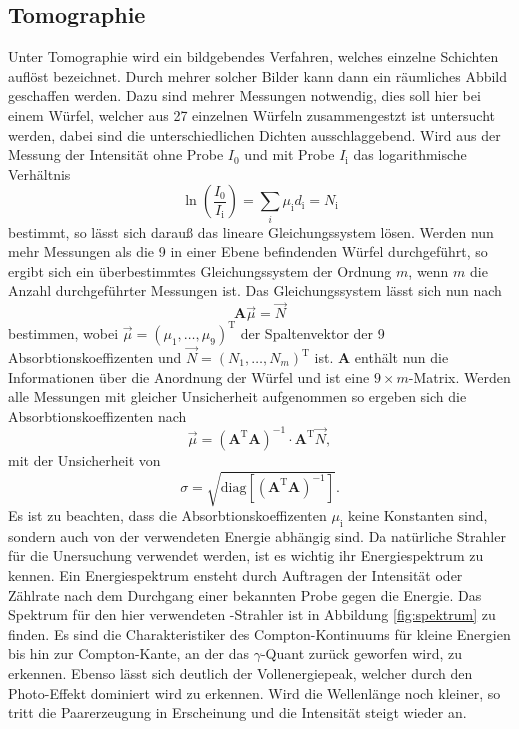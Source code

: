 \subsection{Tomographie}
\label{sec:Tomo}
Unter Tomographie wird ein bildgebendes Verfahren, welches einzelne Schichten auflöst bezeichnet. Durch mehrer solcher Bilder kann dann ein räumliches 
Abbild geschaffen werden. Dazu sind mehrer Messungen notwendig, dies soll hier bei einem 
Würfel, welcher aus \num{27} einzelnen Würfeln zusammengestzt ist untersucht werden, dabei sind die unterschiedlichen Dichten ausschlaggebend.
Wird aus der Messung der Intensität ohne Probe $I_0$ und mit Probe $I_\text{i}$ das logarithmische Verhältnis
\begin{equation}
    \label{eqn:Verhältnis}
    \ln\left(\frac{I_0}{I_\text{i}}\right) = \sum_i \mu_\text{i} d_\text{i} = N_\text{i}
\end{equation}
bestimmt, so lässt sich darauß das lineare Gleichungssystem lösen. Werden nun mehr Messungen als die \num{9} in einer Ebene befindenden Würfel durchgeführt, 
so ergibt sich ein überbestimmtes Gleichungssystem der Ordnung $m$, wenn $m$ die Anzahl durchgeführter Messungen ist.
Das Gleichungssystem lässt sich nun nach
\begin{equation}
    \label{eqn:Gleichungssystem}
    \textbf{A} \vec{\mu} = \vec{N}
\end{equation}
bestimmen, wobei $\vec{\mu} = (\mu_1, \ldots,\mu_9)^\text{T}$ der Spaltenvektor der \num{9} Absorbtionskoeffizenten und $\vec{N} = (N_1, \ldots,N_m)^\text{T}$ ist. 
\textbf{A} enthält nun die Informationen über die Anordnung der Würfel und ist eine $9 \times m$-Matrix. Werden alle Messungen mit gleicher Unsicherheit 
aufgenommen so ergeben sich die Absorbtionskoeffizenten nach
\begin{equation}
    \label{eqn:Absorbtionskoeffizenten}
    \vec{\mu} = (\textbf{A}^\text{T} \textbf{A})^{-1} \cdot \textbf{A}^\text{T} \vec{N},
\end{equation}
mit der Unsicherheit von
\begin{equation}
    \label{eqn:Unsicherheit}
    \sigma = \sqrt{\text{diag}[(\textbf{A}^\text{T} \textbf{A})^{-1}]}.
\end{equation}
Es ist zu beachten, dass die Absorbtionskoeffizenten $\mu_\text{i}$ keine Konstanten sind, sondern auch von der verwendeten Energie abhängig sind. 
Da natürliche Strahler für die Unersuchung verwendet werden, ist es wichtig ihr Energiespektrum zu kennen. Ein Energiespektrum ensteht durch Auftragen der 
Intensität oder Zählrate nach dem Durchgang einer bekannten Probe gegen die Energie. Das Spektrum für den hier verwendeten -Strahler ist in Abbildung \ref{fig:spektrum} zu finden.
Es sind die Charakteristiker des Compton-Kontinuums für kleine Energien bis hin zur Compton-Kante, an der das $\gamma$-Quant zurück geworfen wird, zu erkennen. 
Ebenso lässt sich deutlich der Vollenergiepeak, welcher durch den Photo-Effekt dominiert wird zu erkennen. Wird die Wellenlänge noch kleiner, so tritt die Paarerzeugung
in Erscheinung und die Intensität steigt wieder an.


